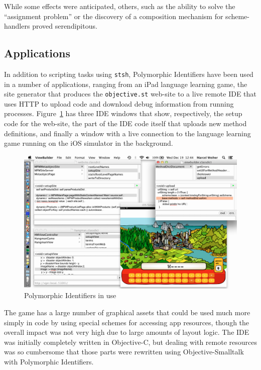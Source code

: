 \documentclass[preprint]{sigplanconf}
\begin{document}
While some effects were anticipated, others, such as the ability to solve the
``assignment problem'' or the discovery of a composition mechanism for
scheme-handlers proved serendipitous.  



\subsection{Applications}

In addition to scripting tasks using {\tt stsh}, Polymorphic Identifiers have been used in a number
of applications, ranging from an iPad language learning game, the site generator that produces the {\tt objective.st} web-site to a
live remote IDE that uses HTTP to upload code and download debug information from running processes.  Figure~\ref{pi-inuse}
has three IDE windows that show, respectively, the setup code for the web-site, the part of the IDE code itself that uploads new method definitions,
and finally a window with a live connection to the language learning game running on the iOS simulator in the background.

\begin{figure}[htbp]
\centering
\includegraphics[scale=0.32,page=1]{PolymorphicIdentifiersInUse.png}
\caption{Polymorphic Identifiers in use}
\label{pi-inuse}
\end{figure}


The game has a large number of graphical assets that could be used much more simply in code by using special schemes for accessing app
resources, though the overall impact was not very high due to large amounts of layout logic. 
 The IDE was initially completely written in Objective-C, but dealing with remote resources was so cumbersome that
those parts were rewritten using Objective-Smalltalk with Polymorphic Identifiers.
\end{document}
